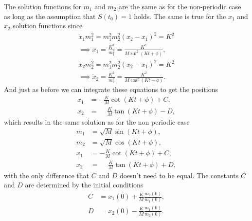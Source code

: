 \documentclass[english,master]{liumaiex}
\theoremstyle{plain}
\theoremstyle{definition}
\begin{document}
The solution functions for $m_1$ and $m_2$ are the same as for the non-periodic case as long as the assumption that $S(t_0) = 1$ holds. The same is true for the $x_1$ and $x_2$ solution functions since
\begin{align}
	\dot{x}_1m_1^2 = m_1^2m_2^2(x_2 - x_1)^2 = K^2 \\
	\implies
	\dot{x}_1 = \frac{K^2}{m_1^2} = \frac{K^2}{M\sin^2(Kt + \phi)}, \\
	\dot{x}_2m_2^2 = m_1^2m_2^2(x_2 - x_1)^2 = K^2 \\
	\implies
	\dot{x}_2 = \frac{K^2}{m_2^2} = \frac{K^2}{M\cos^2(Kt + \phi)}.
\end{align}
%
And just as before we can integrate these equations to get the positions
\begin{equation}
\begin{aligned}
    x_1 &= -\frac{K}{M}\cot(Kt + \phi) + C,\\
    x_2 &= \phantom{-}\frac{K}{M}\tan(Kt + \phi) - D,
\end{aligned}
\end{equation}
which results in the same solution as for the non periodic case
\begin{align}
    m_1 &= \sqrt{M} \sin(K t + \phi), \\
    m_2 &= \sqrt{M} \cos(K t + \phi), \\
    x_1 &= -\frac{K}{M}\cot(Kt + \phi) + C,\\
    x_2 &= \phantom{-}\frac{K}{M}\tan(Kt + \phi) + D,
\end{align}
with the only difference that $C$ and $D$ doesn't need to be equal. The constants $C$ and $D$ are determined by the initial conditions
\begin{equation}
\begin{aligned}
    C &= x_1(0) + \frac{K}{M}\frac{m_2(0)}{m_1(0)}, \\
    D &= x_2(0) - \frac{K}{M}\frac{m_1(0)}{m_2(0)}.
\end{aligned}
\end{equation}
\end{document}
